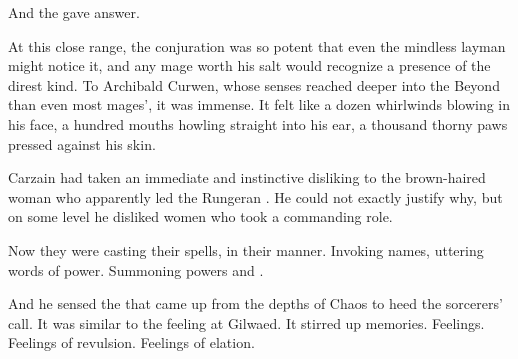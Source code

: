 And the \daemons{} gave answer. 


At this close range, the conjuration was so potent that even the mindless layman might notice it, and any mage worth his salt would recognize a \daemonic{} presence of the direst kind. 
To Archibald Curwen, whose senses reached deeper into the Beyond than even most mages', it was immense. 
It felt like a dozen whirlwinds blowing in his face, a hundred mouths howling straight into his ear, a thousand thorny paws pressed against his skin. 








\begin{comment}
\subsection{Carzain feels Vizicar}
\end{comment}
\new

Carzain had taken an immediate and instinctive disliking to the brown-haired woman who apparently led the Rungeran \ishrah{}. 
He could not exactly justify why, but on some level he disliked women who took a commanding role. 

Now they were casting their spells, in their \rethyactic{} manner. 
Invoking names, uttering words of power. 
Summoning \chaotic{} powers and \daemons. 

And he sensed the \daemons{} that came up from the depths of Chaos to heed the sorcerers' call. 
It was similar to the feeling at Gilwaed. 
It stirred up memories. 
Feelings. 
Feelings of revulsion. 
Feelings of elation. 

